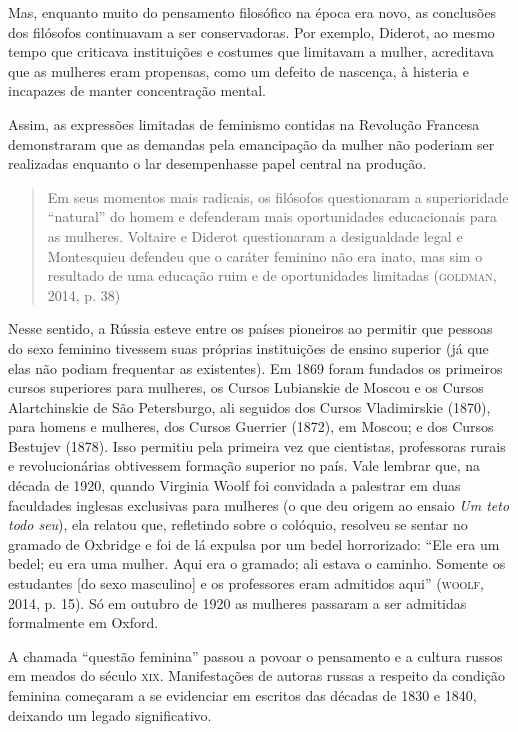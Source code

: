 \documentclass[11pt]{extarticle}
\begin{document}
Mas, enquanto muito do pensamento filosófico na época era novo, as
conclusões dos filósofos continuavam a ser conservadoras. Por exemplo,
Diderot, ao mesmo tempo que criticava instituições e costumes que
limitavam a mulher, acreditava que as mulheres eram propensas, como um
defeito de nascença, à histeria e incapazes de manter concentração
mental.

Assim, as expressões limitadas de feminismo contidas na Revolução
Francesa demonstraram que as demandas pela emancipação da mulher não
poderiam ser realizadas enquanto o lar desempenhasse papel central na
produção.

\begin{quote}
Em seus momentos mais radicais, os filósofos questionaram a
superioridade ``natural'' do homem e defenderam mais oportunidades
educacionais para as mulheres. Voltaire e Diderot questionaram a
desigualdade legal e Montesquieu defendeu que o caráter feminino não era
inato, mas sim o resultado de uma educação ruim e de oportunidades
limitadas (\textsc{goldman}, 2014, p. 38)
\end{quote}

Nesse sentido, a Rússia esteve entre os países pioneiros ao permitir que
pessoas do sexo feminino tivessem suas próprias instituições de ensino
superior (já que elas não podiam frequentar as existentes). Em 1869
foram fundados os primeiros cursos superiores para mulheres, os Cursos
Lubianskie de Moscou e os Cursos Alartchinskie de São Petersburgo, ali
seguidos dos Cursos Vladimirskie (1870), para homens e mulheres, dos
Cursos Guerrier (1872), em Moscou; e dos Cursos Bestujev (1878). Isso
permitiu pela primeira vez que cientistas, professoras rurais e
revolucionárias obtivessem formação superior no país. Vale lembrar que,
na década de 1920, quando Virginia Woolf foi convidada a palestrar em
duas faculdades inglesas exclusivas para mulheres (o que deu origem ao
ensaio \emph{Um teto todo seu}), ela relatou que, refletindo sobre o
colóquio, resolveu se sentar no gramado de Oxbridge e foi de lá expulsa
por um bedel horrorizado: ``Ele era um bedel; eu era uma mulher. Aqui
era o gramado; ali estava o caminho. Somente os estudantes {[}do sexo
masculino{]} e os professores eram admitidos aqui'' (\textsc{woolf}, 2014, p.
15). Só em outubro de 1920 as mulheres passaram a ser admitidas
formalmente em Oxford.

A chamada ``questão feminina'' passou a povoar o pensamento e a cultura
russos em meados do século \textsc{xix}. Manifestações de autoras russas a
respeito da condição feminina começaram a se evidenciar em escritos das
décadas de 1830 e 1840, deixando um legado significativo.
\end{document}
